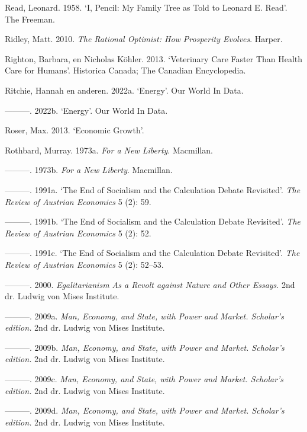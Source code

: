 \documentclass[
  a5paper,
  smalldemyvopaper,11pt,twoside,onecolumn,openright,extrafontsizes,
hidelinks]{memoir}
\newlength{\cslhangindent}
\newenvironment{CSLReferences}[2] %
 {\begin{list}{}{%
  \setlength{\itemindent}{0pt}
  \setlength{\leftmargin}{0pt}
  \setlength{\parsep}{0pt}
  \ifodd #1
   \setlength{\leftmargin}{\cslhangindent}
   \setlength{\itemindent}{-1\cslhangindent}
  \fi
  \setlength{\itemsep}{#2\baselineskip}}}
 {\end{list}}
\begin{document}
\begin{CSLReferences}{1}{0}
Read, Leonard. 1958. {`I, Pencil: My Family Tree as Told to Leonard E.
Read'}. The Freeman.

Ridley, Matt. 2010. \emph{The Rational Optimist: How Prosperity
Evolves}. Harper.

Righton, Barbara, en Nicholas Köhler. 2013. {`Veterinary Care Faster
Than Health Care for Humans'}. Historica Canada; The Canadian
Encyclopedia.

Ritchie, Hannah en anderen. 2022a. {`Energy'}. Our World In Data.

---------. 2022b. {`Energy'}. Our World In Data.

Roser, Max. 2013. {`Economic Growth'}.

Rothbard, Murray. 1973a. \emph{For a New Liberty}. Macmillan.

---------. 1973b. \emph{For a New Liberty}. Macmillan.

---------. 1991a. {`The End of Socialism and the Calculation Debate
Revisited'}. \emph{The Review of Austrian Economics} 5 (2): 59.

---------. 1991b. {`The End of Socialism and the Calculation Debate
Revisited'}. \emph{The Review of Austrian Economics} 5 (2): 52.

---------. 1991c. {`The End of Socialism and the Calculation Debate
Revisited'}. \emph{The Review of Austrian Economics} 5 (2): 52--53.

---------. 2000. \emph{Egalitarianism As a Revolt against Nature and
Other Essays}. 2nd dr. Ludwig von Mises Institute.

---------. 2009a. \emph{Man, Economy, and State, with Power and Market.
Scholar's edition.} 2nd dr. Ludwig von Mises Institute.

---------. 2009b. \emph{Man, Economy, and State, with Power and Market.
Scholar's edition.} 2nd dr. Ludwig von Mises Institute.

---------. 2009c. \emph{Man, Economy, and State, with Power and Market.
Scholar's edition.} 2nd dr. Ludwig von Mises Institute.

---------. 2009d. \emph{Man, Economy, and State, with Power and Market.
Scholar's edition.} 2nd dr. Ludwig von Mises Institute.


\end{CSLReferences}
\end{document}
